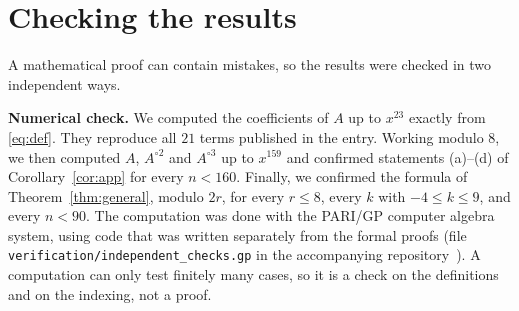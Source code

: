 \documentclass[11pt,a4paper]{article}
\theoremstyle{definition}
\theoremstyle{remark}
\newcommand{\para}[1]{\par\medskip\noindent\textbf{#1}\enspace}
\begin{document}
\section{Checking the results}\label{sec:checks}

A mathematical proof can contain mistakes, so the results were checked in two independent ways.

\para{Numerical check.}
We computed the coefficients of $A$ up to $x^{23}$ exactly from \eqref{eq:def}. They reproduce all
$21$ terms published in the entry. Working modulo $8$, we then computed $A$, $A^{\circ2}$ and $A^{\circ3}$ up to
$x^{159}$ and confirmed statements (a)--(d) of Corollary~\ref{cor:app} for every $n<160$. Finally, we confirmed the
formula of Theorem~\ref{thm:general}, modulo $2r$, for every $r\le8$, every $k$ with $-4\le k\le9$, and every $n<90$.
The computation was done with the PARI/GP computer algebra system, using code that was written separately from the
formal proofs (file \texttt{verification/independent\_checks.gp} in the accompanying repository~\cite{repo}).
A computation can only test finitely many cases, so it is a check on the definitions and on the indexing, not a proof.
\end{document}
